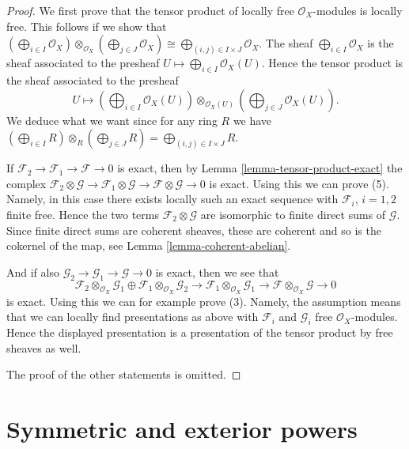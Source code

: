 \begin{proof}
We first prove that the tensor product of locally free
$\mathcal{O}_X$-modules is locally free. This follows if we show
that
$(\bigoplus_{i \in I} \mathcal{O}_X) \otimes_{\mathcal{O}_X}
(\bigoplus_{j \in J} \mathcal{O}_X) \cong
\bigoplus_{(i, j) \in I \times J} \mathcal{O}_X$.
The sheaf $\bigoplus_{i \in I} \mathcal{O}_X$ is the sheaf associated
to the presheaf $U \mapsto \bigoplus_{i \in I} \mathcal{O}_X(U)$.
Hence the tensor product is the sheaf associated
to the presheaf
$$
U \longmapsto
(\bigoplus\nolimits_{i \in I} \mathcal{O}_X(U))
\otimes_{\mathcal{O}_X(U)}
(\bigoplus\nolimits_{j \in J} \mathcal{O}_X(U)).
$$
We deduce what we want since for any ring $R$ we have
$(\bigoplus_{i \in I} R) \otimes_R (\bigoplus_{j \in J} R) =
\bigoplus_{(i, j) \in I \times J} R$.

\medskip\noindent
If $\mathcal{F}_2 \to \mathcal{F}_1 \to \mathcal{F} \to 0$
is exact, then by Lemma \ref{lemma-tensor-product-exact}
the complex
$\mathcal{F}_2 \otimes \mathcal{G} \to
\mathcal{F}_1 \otimes \mathcal{G} \to
\mathcal{F} \otimes \mathcal{G} \to 0$
is exact. Using this we can prove (5). Namely, in this case there
exists locally such an exact sequence with $\mathcal{F}_i$, $i = 1, 2$
finite free. Hence the two terms $\mathcal{F}_2 \otimes \mathcal{G}$
are isomorphic to finite direct sums of $\mathcal{G}$.
Since finite direct sums are coherent sheaves, these are coherent
and so is the cokernel of the map, see Lemma \ref{lemma-coherent-abelian}.

\medskip\noindent
And if also
$\mathcal{G}_2 \to \mathcal{G}_1 \to \mathcal{G} \to 0$
is exact, then we see that
$$
\mathcal{F}_2 \otimes_{\mathcal{O}_X} \mathcal{G}_1
\oplus
\mathcal{F}_1 \otimes_{\mathcal{O}_X} \mathcal{G}_2
\to
\mathcal{F}_1 \otimes_{\mathcal{O}_X} \mathcal{G}_1
\to
\mathcal{F} \otimes_{\mathcal{O}_X} \mathcal{G}
\to 0
$$
is exact. Using this we can for example prove (3).
Namely, the assumption means that we can locally find presentations
as above with $\mathcal{F}_i$ and $\mathcal{G}_i$
free $\mathcal{O}_X$-modules. Hence the displayed presentation
is a presentation of the tensor product by free sheaves as well.

\medskip\noindent
The proof of the other statements is omitted.
\end{proof}




\section{Symmetric and exterior powers}
\label{section-symmetric-exterior}

